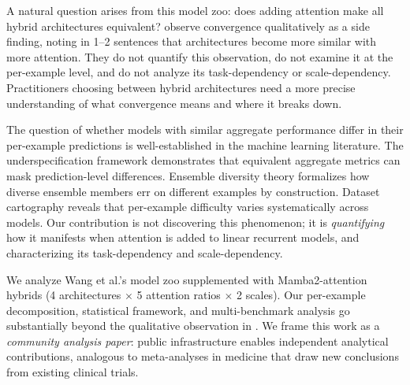 \documentclass[11pt]{article}
\begin{document}
A natural question arises from this model zoo: does adding attention make all hybrid architectures equivalent?
\citet{wang2025zoo} observe convergence qualitatively as a side finding, noting in 1--2 sentences that architectures become more similar with more attention.
They do not quantify this observation, do not examine it at the per-example level, and do not analyze its task-dependency or scale-dependency.
Practitioners choosing between hybrid architectures need a more precise understanding of what convergence means and where it breaks down.

The question of whether models with similar aggregate performance differ in their per-example predictions is well-established in the machine learning literature.
The underspecification framework \citep{damour2022underspecification} demonstrates that equivalent aggregate metrics can mask prediction-level differences.
Ensemble diversity theory \citep{krogh1995neural, kuncheva2003measures} formalizes how diverse ensemble members err on different examples by construction.
Dataset cartography \citep{swayamdipta2020dataset} reveals that per-example difficulty varies systematically across models.
Our contribution is not discovering this phenomenon; it is \textit{quantifying} how it manifests when attention is added to linear recurrent models, and characterizing its task-dependency and scale-dependency.

We analyze Wang et al.'s model zoo supplemented with Mamba2-attention hybrids \citep{dao2024mamba2} (4 architectures $\times$ 5 attention ratios $\times$ 2 scales).
Our per-example decomposition, statistical framework, and multi-benchmark analysis go substantially beyond the qualitative observation in \citet{wang2025zoo}.
We frame this work as a \textit{community analysis paper}: public infrastructure enables independent analytical contributions, analogous to meta-analyses in medicine that draw new conclusions from existing clinical trials.
\end{document}
